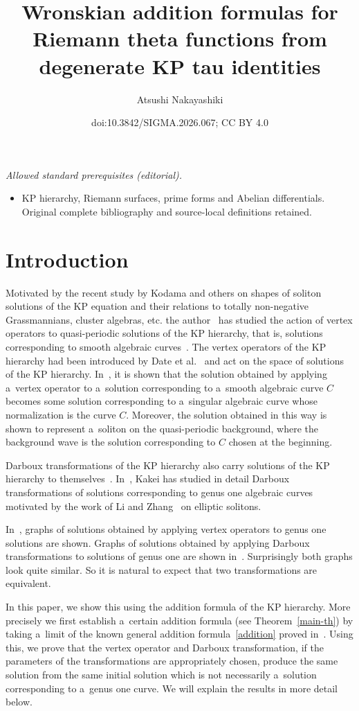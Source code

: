 \documentclass[10pt,a4paper]{amsart}
\title{Wronskian addition formulas for Riemann theta functions from degenerate KP tau identities}
\author{Atsushi Nakayashiki}
\date{doi:10.3842/SIGMA.2026.067; CC BY 4.0}
\numberwithin{equation}{section}
\theoremstyle{definition}
\begin{document}
\maketitle
\noindent\textit{Allowed standard prerequisites (editorial).}\begin{itemize}
\item KP hierarchy, Riemann surfaces, prime forms and Abelian differentials. Original complete bibliography and source-local definitions retained.
\end{itemize}\medskip
\section{Introduction}
Motivated by the recent study by Kodama and others
\cite{CK2008,Kodama2017, KW2011,KW2014} on shapes of soliton solutions of the KP equation and their relations to totally non-negative Grassmannians, cluster algebras, etc. the author~\cite{Nak2024} has studied the action of vertex operators to quasi-periodic solutions of the KP hierarchy, that is, solutions corresponding to smooth algebraic curves~\cite{Krichever1977,Segal-Wilson1985}. The vertex operators of the KP hierarchy had been introduced
by Date et al.\ \cite{DJKM} and act on the space of solutions of the KP hierarchy. In~\cite{Nak2024}, it is shown that the solution obtained by applying a~vertex operator to a~solution corresponding to a~smooth algebraic curve $C$
becomes some solution corresponding to a~singular algebraic curve whose normalization is the curve $C$.
Moreover, the solution obtained in this way is shown to represent a~soliton on the quasi-periodic background, where the background wave is the solution corresponding to $C$ chosen at the beginning.

Darboux transformations of the KP hierarchy also carry solutions of the KP hierarchy to
themselves~\cite{H-van-de-Leur2001,Kakei,Matveev-Salle1991,Ovel1993}. In~\cite{Kakei}, Kakei has studied in detail Darboux transformations of
solutions corresponding to genus one algebraic curves motivated by the work of Li and Zhang~\cite{Li-Zhang2022} on elliptic solitons.

In~\cite{Nak2024}, graphs of solutions obtained by applying vertex operators
to genus one solutions are shown. Graphs of solutions obtained by applying Darboux transformations to solutions of genus one are shown in~\cite{Kakei}.
Surprisingly both graphs look quite similar.
So it is natural to expect that two transformations are equivalent.

In this paper, we show this using the addition formula of the KP hierarchy.
More precisely we first establish a~certain addition formula
 (see Theorem~\ref{main-th}) by taking a~limit of the known general addition
formula~\eqref{addition} proved in~\cite{Shigyo2013}.
Using this, we prove that the vertex operator and Darboux transformation, if the parameters of the
transformations are appropriately chosen, produce the same solution
from the same initial solution which is not necessarily a~solution corresponding to a~genus one curve. We will explain the results in more detail below.
\end{document}
